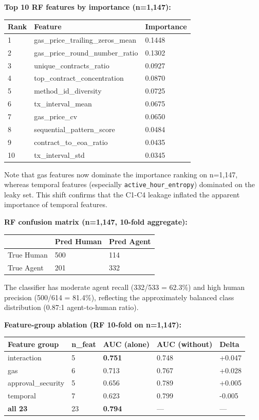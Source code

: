 \documentclass[sigconf,nonacm=false]{acmart}
\begin{document}
\textbf{Top 10 RF features by importance (n=1,147):}

\begin{table}[h]
\centering
\small
\begin{tabular}{lll}
\toprule
Rank & Feature & Importance \\
\midrule
1 & gas\_price\_trailing\_zeros\_mean & 0.1448 \\
2 & gas\_price\_round\_number\_ratio & 0.1302 \\
3 & unique\_contracts\_ratio & 0.0927 \\
4 & top\_contract\_concentration & 0.0870 \\
5 & method\_id\_diversity & 0.0725 \\
6 & tx\_interval\_mean & 0.0675 \\
7 & gas\_price\_cv & 0.0650 \\
8 & sequential\_pattern\_score & 0.0484 \\
9 & contract\_to\_eoa\_ratio & 0.0435 \\
10 & tx\_interval\_std & 0.0345 \\
\bottomrule
\end{tabular}
\end{table}

Note that gas features now dominate the importance ranking on n=1,147, whereas temporal features (especially \texttt{active\_hour\_entropy}) dominated on the leaky set. This shift confirms that the C1-C4 leakage inflated the apparent importance of temporal features.

\textbf{RF confusion matrix (n=1,147, 10-fold aggregate):}

\begin{table}[h]
\centering
\small
\begin{tabular}{lll}
\toprule
 & Pred Human & Pred Agent \\
\midrule
True Human & 500 & 114 \\
True Agent & 201 & 332 \\
\bottomrule
\end{tabular}
\end{table}

The classifier has moderate agent recall (332/533 = 62.3\%) and high human precision (500/614 = 81.4\%), reflecting the approximately balanced class distribution (0.87:1 agent-to-human ratio).

\textbf{Feature-group ablation (RF 10-fold on n=1,147):}

\begin{table}[h]
\centering
\small
\begin{tabular}{lllll}
\toprule
Feature group & n\_feat & AUC (alone) & AUC (without) & Delta \\
\midrule
interaction & 5 & \textbf{0.751} & 0.748 & +0.047 \\
gas & 6 & 0.713 & 0.767 & +0.028 \\
approval\_security & 5 & 0.656 & 0.789 & +0.005 \\
temporal & 7 & 0.623 & 0.799 & -0.005 \\
\textbf{all 23} & 23 & \textbf{0.794} & — & — \\
\bottomrule
\end{tabular}
\end{table}
\end{document}
